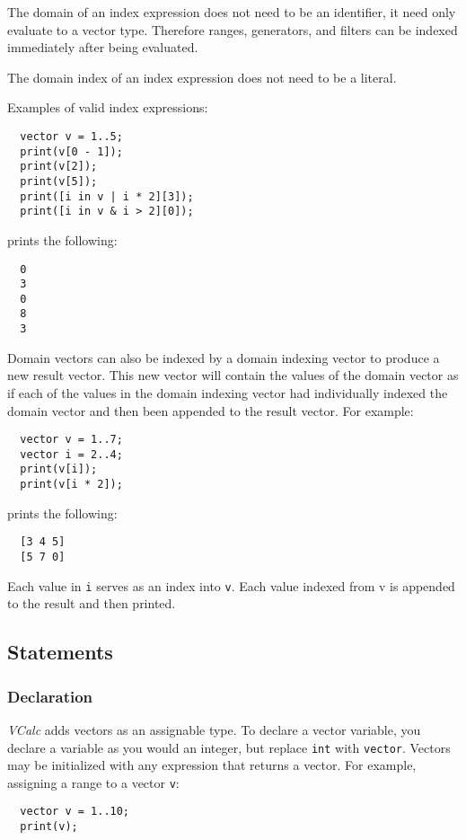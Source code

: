 \documentclass{article}
\newcommand{\code}[1]{\texttt{\textmd{#1}}}
\begin{document}
The domain of an index expression does not need to be an identifier, it need only evaluate to a
vector type. Therefore ranges, generators, and filters can be indexed immediately after being
evaluated.

The domain index of an index expression does not need to be a literal.

Examples of valid index expressions:
\begin{lstlisting}
  vector v = 1..5;
  print(v[0 - 1]);
  print(v[2]);
  print(v[5]);
  print([i in v | i * 2][3]);
  print([i in v & i > 2][0]);
\end{lstlisting}

prints the following:
\begin{lstlisting}
  0
  3
  0
  8
  3
\end{lstlisting}

Domain vectors can also be indexed by a domain indexing vector to produce a new result vector. This
new vector will contain the values of the domain vector as if each of the values in the domain
indexing vector had individually indexed the domain vector and then been appended to the result
vector. For example:
\begin{lstlisting}
  vector v = 1..7;
  vector i = 2..4;
  print(v[i]);
  print(v[i * 2]);
\end{lstlisting}

prints the following:
\begin{lstlisting}
  [3 4 5]
  [5 7 0]
\end{lstlisting}

Each value in \code{i} serves as an index into \code{v}. Each value indexed from v is appended to
the result and then printed.

\subsection{Statements}
\subsubsection{Declaration}
\textit{VCalc} adds vectors as an assignable type. To declare a vector variable, you declare a
variable as you would an integer, but replace \code{int} with \code{vector}. Vectors may be
initialized with any expression that returns a vector. For example, assigning a range to a vector
\code{v}:
\begin{lstlisting}
  vector v = 1..10;
  print(v);
\end{lstlisting}
\end{document}
